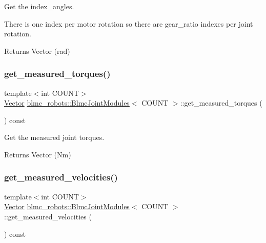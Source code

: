 Get the index\+\_\+angles. 

There is one index per motor rotation so there are gear\+\_\+ratio indexes per joint rotation.

\begin{DoxyReturn}{Returns}
Vector (rad) 
\end{DoxyReturn}
\mbox{\label{classblmc__robots_1_1BlmcJointModules_a24e9a88d03b45f08f9ce0decce7403c0}} 
\subsubsection{\texorpdfstring{get\+\_\+measured\+\_\+torques()}{get\_measured\_torques()}}
{\footnotesize\ttfamily template$<$int C\+O\+U\+NT$>$ \\
\hyperlink{classblmc__robots_1_1BlmcJointModules_abaff382c6fd4b494ec0c17498d94919e}{Vector} \hyperlink{classblmc__robots_1_1BlmcJointModules}{blmc\+\_\+robots\+::\+Blmc\+Joint\+Modules}$<$ C\+O\+U\+NT $>$\+::get\+\_\+measured\+\_\+torques (\begin{DoxyParamCaption}{ }\end{DoxyParamCaption}) const\hspace{0.3cm}{\ttfamily [inline]}}



Get the measured joint torques. 

\begin{DoxyReturn}{Returns}
Vector (Nm) 
\end{DoxyReturn}
\mbox{\label{classblmc__robots_1_1BlmcJointModules_a6138e9e42ce53ce9c5fc7728c5c51558}} 
\subsubsection{\texorpdfstring{get\+\_\+measured\+\_\+velocities()}{get\_measured\_velocities()}}
{\footnotesize\ttfamily template$<$int C\+O\+U\+NT$>$ \\
\hyperlink{classblmc__robots_1_1BlmcJointModules_abaff382c6fd4b494ec0c17498d94919e}{Vector} \hyperlink{classblmc__robots_1_1BlmcJointModules}{blmc\+\_\+robots\+::\+Blmc\+Joint\+Modules}$<$ C\+O\+U\+NT $>$\+::get\+\_\+measured\+\_\+velocities (\begin{DoxyParamCaption}{ }\end{DoxyParamCaption}) const\hspace{0.3cm}{\ttfamily [inline]}}



